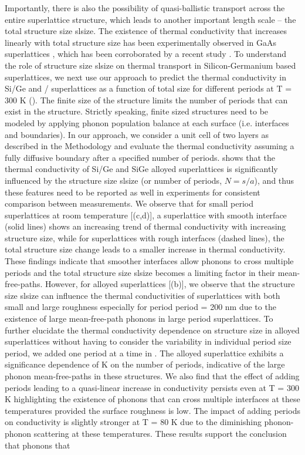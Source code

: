 \par Importantly, there is also the possibility of quasi-ballistic transport across the entire superlattice structure, which leads to another important length scale -- the total structure size \gls{slsize}. The existence of thermal conductivity that increases linearly with total structure size has been experimentally observed in GaAs superlattices \cite{RN394}, which has been corroborated by a recent study \cite{RN544}. To understand the role of structure size \gls{slsize} on thermal transport in Silicon-Germanium based superlattices, we next use our approach to predict the thermal conductivity in Si/Ge and / superlattices as a function of total size for different periods at \gls{T} = 300 K (). The finite size of the structure limits the number of periods that can exist in the structure. Strictly speaking, finite sized structures need to be modeled by applying phonon population balance at each surface (i.e. interfaces and boundaries). In our approach, we consider a unit cell of two layers as described in the Methodology and evaluate the thermal conductivity assuming a fully diffusive boundary after a specified number of periods.  shows that the thermal conductivity of Si/Ge and SiGe alloyed superlattices is significantly influenced by the structure size \gls{slsize} (or number of periods, $N = s/a$), and thus these features need to be reported as well in experiments for consistent comparison between measurements. We observe that for small period superlattices at room temperature [(c,d)], a superlattice with smooth interface (solid lines) shows an increasing trend of thermal conductivity with increasing structure size, while for superlattices with rough interfaces (dashed lines), the total structure size change leads to a smaller increase in thermal conductivity. These findings indicate that smoother interfaces allow phonons to cross multiple periods and the total structure size \gls{slsize} becomes a limiting factor in their mean-free-paths. However, for alloyed superlattices [(b)], we observe that the structure size \gls{slsize} can influence the thermal conductivities of superlattices with both small and large roughness especially for period \gls{period} = 200 nm due to the existence of large mean-free-path phonons in large period superlattices. To further elucidate the thermal conductivity dependence on structure size in alloyed superlattices without having to consider the variability in individual period size \gls{period}, we added one period at a time in . The alloyed superlattice exhibits a significance dependence of \gls{K} on the number of periods, indicative of the large phonon mean-free-paths in these structures. We also find that the effect of adding periods leading to a quasi-linear increase in conductivity persists even at \gls{T} = 300 K highlighting the existence of phonons that can cross multiple interfaces at these temperatures provided the surface roughness is low. The impact of adding periods on conductivity is slightly stronger at \gls{T} = 80 K due to the diminishing phonon-phonon scattering at these temperatures. These results support the conclusion that phonons that 